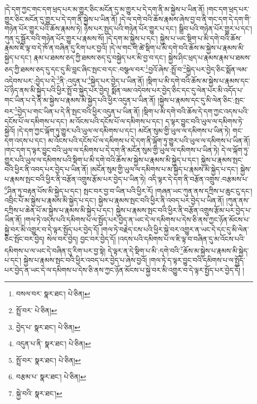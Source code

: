 །དེ་དག་ཀྱང་གང་དག་ཕྲད་པར་མ་གྱུར་ཅིང་མངོན་དུ་མ་གྱུར་པ་དེ་དག་ནི་མ་སྐྱེས་པ་ཡིན་ནོ། །གང་དག་ཕྲད་པར་གྱུར་ཅིང་མངོན་དུ་གྱུར་པ་དེ་དག་ནི་སྐྱེས་པ་ཡིན་ནོ། །དེ་ལ་དགེ་བའི་ཆོས་རྣམས་ཞེས་བྱ་བ་ནི་གང་དག་དེ་དག་གི་གཉེན་པོར་གྱུར་པའི་ཆོས་རྣམས་ཏེ། ཉེས་པར་སྤྱད་པའི་གཉེན་པོར་གྱུར་པ་དང་། སྒྲིབ་པའི་གཉེན་པོར་གྱུར་པ་དང་། ཀུན་དུ་སྦྱོར་བའི་གཉེན་པོར་གྱུར་པ་རྣམས་སོ། །དེ་དག་མ་སྐྱེས་པ་དང་། སྐྱེས་པ་ཡང་སྡིག་པ་མི་དགེ་བའི་ཆོས་རྣམས་ཇི་ལྟ་བ་དེ་ཁོ་ན་བཞིན་དུ་རིག་པར་བྱའོ། །དེ་ལ་གང་གི་ཚེ་སྡིག་པ་མི་དགེ་བའི་ཆོས་མ་སྐྱེས་པ་རྣམས་མི་སྐྱེད་པ་དང་། རྣམ་པ་ཐམས་ཅད་ཀྱི་ཐམས་ཅད་དུ་བསྐྱེད་པར་མི་བྱ་བ་དང་། སྐྱེས་ཤིང་ཕྲད་པ་རྣམས་རྣམ་པ་ཐམས་ཅད་ཀྱི་ཐམས་ཅད་དུ་དང་དུ་མི་བླང་ཞིང་སྤང་བ་དང་:བསྩལ་བར་\footnote{བསལ་བར་  སྣར་ཐང་།  པེ་ཅིན། }བྱའོ་ཞེས་:སྤྲོ་བ་\footnote{སྤྲོ་བར་  པེ་ཅིན། }སྐྱེད་པར་བྱེད་ཅིང་སྨོན་ལམ་འདེབས་པར་:བྱེད་པ་དེ་\footnote{བྱེད་པ་  སྣར་ཐང་།  པེ་ཅིན། }ནི་:འདུན་པ་\footnote{འདུན་པ་ནི་  སྣར་ཐང་།  པེ་ཅིན། }སྐྱེད་པར་བྱེད་པ་ཡིན་ནོ། །སྡིག་པ་མི་དགེ་བའི་ཆོས་མ་སྐྱེས་པ་རྣམས་དང་པོ་ཉིད་ནས་མི་སྐྱེད་པའི་ཕྱིར་སྤྲོ་བ་སྐྱེད་པར་བྱེད། སྨོན་ལམ་འདེབས་པར་བྱེད་ཅིང་དང་དུ་ལེན་པར་མི་འདོད་པ་གང་ཡིན་པ་དེ་ནི་མ་སྐྱེས་པ་རྣམས་མི་སྐྱེད་པའི་ཕྱིར་འདུན་པ་ཡིན་ནོ། །སྐྱེས་པ་རྣམས་དང་དུ་མི་ལེན་ཅིང་:སྤང་བར་\footnote{སྤྲོ་བར་  སྣར་ཐང་།  པེ་ཅིན། }བྱེད་པ་གང་ཡིན་པ་དེ་ནི་སྤང་བའི་ཕྱིར་འདུན་པ་ཡིན་ནོ། །སྡིག་པ་མི་དགེ་བའི་ཆོས་དེ་དག་ཀྱང་འདས་པའི་དངོས་པོ་ལ་དམིགས་པ་དང་། མ་འོངས་པའི་དངོས་པོ་ལ་དམིགས་པ་དང་། ད་ལྟར་བྱུང་བའི་ཡུལ་ལ་དམིགས་ཏེ་སྐྱེའོ། །དེ་དག་ཀྱང་ལྐོག་ཏུ་གྱུར་པའི་ཡུལ་ལ་དམིགས་པ་དང་། མངོན་སུམ་གྱི་ཡུལ་ལ་དམིགས་པ་ཡིན་ཏེ། གང་དག་འདས་པ་དང་། མ་འོངས་པའི་དངོས་པོ་ལ་དམིགས་པ་དེ་དག་ནི་ལྐོག་ཏུ་གྱུར་པའི་ཡུལ་ལ་དམིགས་པ་ཡིན་ནོ། །གང་དག་ད་ལྟར་བྱུང་བའི་ཡུལ་ལ་དམིགས་པ་དེ་དག་ནི་མངོན་སུམ་གྱི་ཡུལ་ལ་དམིགས་པ་ཡིན་ཏེ། དེ་ལ་ལྐོག་ཏུ་གྱུར་པའི་ཡུལ་ལ་དམིགས་པའི་སྡིག་པ་མི་དགེ་བའི་ཆོས་མ་སྐྱེས་པ་རྣམས་མི་སྐྱེད་པ་དང་། སྐྱེས་པ་རྣམས་སྤང་བའི་ཕྱིར་ནི་འབད་པར་བྱེད་པ་ཡིན་ནོ། །མངོན་སུམ་གྱི་ཡུལ་ལ་དམིགས་པ་མ་སྐྱེད་པ་རྣམས་མི་སྐྱེད་པ་དང་། སྐྱེས་པ་རྣམས་སྤང་བའི་ཕྱིར་ནི་བརྩོན་འགྲུས་རྩོམ་པར་བྱེད་པ་ཡིན་ཏེ། འདི་ལྟར་དེ་དག་ནི་བརྩོན་འགྲུས་:བརྩམས་པ་\footnote{བརྩམ་པ་  སྣར་ཐང་།  པེ་ཅིན། }ཤིན་ཏུ་བརྟན་པོས་མི་སྐྱེད་པ་དང་། སྤང་བར་བྱ་བ་ཡིན་པའི་ཕྱིར་རོ། །གཞན་ཡང་ཀུན་ནས་དཀྲིས་པ་ཆུང་ངུ་དང་། འབྲིང་པོ་མ་སྐྱེས་པ་རྣམས་མི་སྐྱེད་པ་དང་། སྐྱེས་པ་རྣམས་སྤང་བའི་ཕྱིར་ནི་འབད་པར་བྱེད་པ་ཡིན་ནོ། །ཀུན་ནས་དཀྲིས་པ་ཆེན་པོ་མ་སྐྱེས་པ་རྣམས་མི་སྐྱེད་པ་དང་། སྐྱེས་པ་རྣམས་སྤང་བའི་ཕྱིར་ནི་བརྩོན་འགྲུས་རྩོམ་པར་བྱེད་པ་ཡིན་ནོ། །གལ་ཏེ་འདས་པའི་དམིགས་པ་ལ་སྤྱོད་པར་བྱེད་ན་ཡང་དེ་ལ་དམིགས་པ་དེས་ཅི་ནས་ཀྱང་ཉོན་མོངས་པ་སྐྱེ་བར་མི་འགྱུར་བ་དེ་ལྟར་སྤྱོད་པར་བྱེད་དོ། །གལ་ཏེ་བརྗེད་ངས་པའི་ཕྱིར་སྐྱེ་བར་འགྱུར་ན་ཡང་དེ་དང་དུ་མི་ལེན་ཅིང་སྤོང་བར་བྱེད། སེལ་བར་བྱེད། བྱང་བར་བྱེད་དོ། །འདས་པའི་དམིགས་པ་ལ་ཇི་ལྟ་བ་བཞིན་དུ་མ་འོངས་པའི་དམིགས་པ་ལ་ཡང་དེ་བཞིན་དུ་རིག་པར་བྱ་སྟེ། དེ་ལྟར་ན་དེ་སྡིག་པ་མི་:དགེ་བའི་\footnote{སྐྱེ་བའི་  སྣར་ཐང་། }ཆོས་མ་སྐྱེས་པ་རྣམས་མི་སྐྱེད་པ་དང་། སྐྱེས་པ་རྣམས་སྤང་བའི་ཕྱིར་འབད་པར་བྱེད་པ་ཞེས་བྱའོ། །གལ་ཏེ་ད་ལྟར་བྱུང་བའི་དམིགས་པ་ལ་སྤྱོད་པར་བྱེད་ན་ཡང་དེ་ལ་དམིགས་པ་དེས་ཅི་ནས་ཀྱང་ཉོན་མོངས་པ་སྐྱེ་བར་མི་འགྱུར་བ་དེ་ལྟར་སྤྱོད་པར་བྱེད་དོ། །

